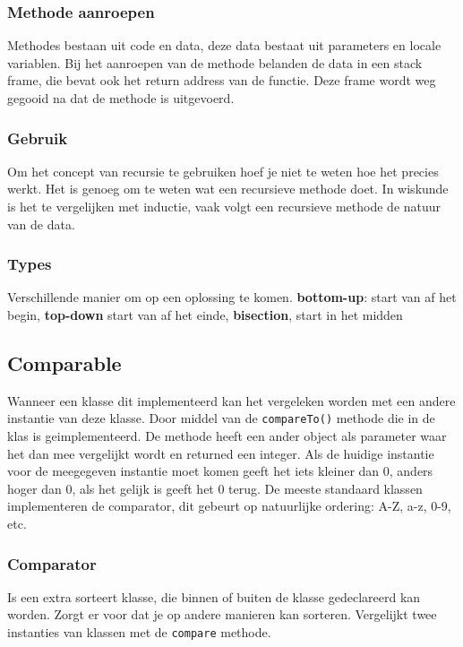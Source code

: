 \subsubsection{Methode aanroepen}
Methodes bestaan uit code en data, deze data bestaat uit parameters en locale variablen.
Bij het aanroepen van de methode belanden de data in een stack frame, die bevat ook het return address van de functie.
Deze frame wordt weg gegooid na dat de methode is uitgevoerd.

\subsubsection{Gebruik}
Om het concept van recursie te gebruiken hoef je niet te weten hoe het precies werkt.
Het is genoeg om te weten wat een recursieve methode doet.
In wiskunde is het te vergelijken met inductie, vaak volgt een recursieve methode de natuur van de data.

\subsubsection{Types}
Verschillende manier om op een oplossing te komen.
\textbf{bottom-up}: start van af het begin, \textbf{top-down} start van af het einde, \textbf{bisection}, start in het midden

\subsection{Comparable}
Wanneer een klasse dit implementeerd kan het vergeleken worden met een andere instantie van deze klasse.
Door middel van de \texttt{compareTo()} methode die in de klas is geimplementeerd.
De methode heeft een ander object als parameter waar het dan mee vergelijkt wordt en returned een integer.
Als de huidige instantie voor de meegegeven instantie moet komen geeft het iets kleiner dan 0, anders hoger dan 0, als het gelijk is geeft het 0 terug.
De meeste standaard klassen implementeren de comparator, dit gebeurt op natuurlijke ordering: A-Z, a-z, 0-9, etc.

\subsubsection{Comparator}
Is een extra sorteert klasse, die binnen of buiten de klasse gedeclareerd kan worden.
Zorgt er voor dat je op andere manieren kan sorteren.
Vergelijkt twee instanties van klassen met de \texttt{compare} methode.


